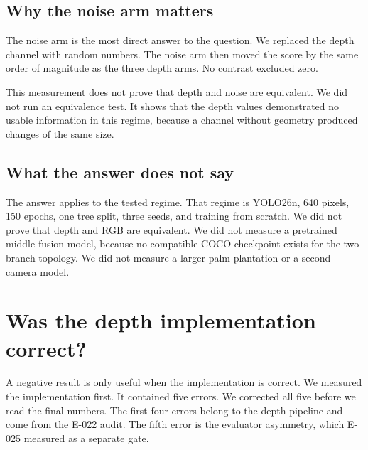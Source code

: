 \documentclass[preprint,12pt]{elsarticle}
\newcommand{\E}[1]{E-#1}
\begin{document}
\subsection{Why the noise arm matters}

The noise arm is the most direct answer to the question. We replaced the depth
channel with random numbers. The noise arm then moved the score by the same
order of magnitude as the three depth arms. No contrast excluded zero.

This measurement does not prove that depth and noise are equivalent. We did not
run an equivalence test. It shows that the depth values demonstrated no usable
information in this regime, because a channel without geometry produced changes
of the same size.

\subsection{What the answer does not say}

The answer applies to the tested regime. That regime is YOLO26n, 640 pixels,
150 epochs, one tree split, three seeds, and training from scratch. We did not
prove that depth and RGB are equivalent. We did not measure a pretrained
middle-fusion model, because no compatible COCO checkpoint exists for the
two-branch topology. We did not measure a larger palm plantation or a second
camera model.

\section{Was the depth implementation correct?}
\label{sec:implementation}

A negative result is only useful when the implementation is correct. We
measured the implementation first. It contained five errors. We corrected all
five before we read the final numbers. The first four errors belong to the depth
pipeline and come from the \E{022} audit. The fifth error is the evaluator
asymmetry, which \E{025} measured as a separate gate.
\end{document}

